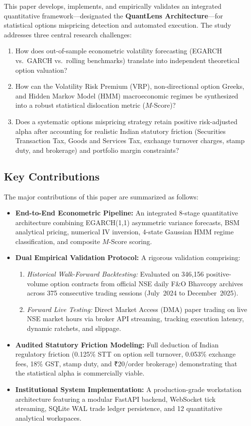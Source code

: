 \documentclass[journal]{IEEEtran}
\begin{document}
This paper develops, implements, and empirically validates an integrated quantitative framework---designated the \textbf{QuantLens Architecture}---for statistical options mispricing detection and automated execution. The study addresses three central research challenges:
\begin{enumerate}
    \item How does out-of-sample econometric volatility forecasting (EGARCH vs.\ GARCH vs.\ rolling benchmarks) translate into independent theoretical option valuation?
    \item How can the Volatility Risk Premium (VRP), non-directional option Greeks, and Hidden Markov Model (HMM) macroeconomic regimes be synthesized into a robust statistical dislocation metric ($M$-Score)?
    \item Does a systematic options mispricing strategy retain positive risk-adjusted alpha after accounting for realistic Indian statutory friction (Securities Transaction Tax, Goods and Services Tax, exchange turnover charges, stamp duty, and brokerage) and portfolio margin constraints?
\end{enumerate}

\subsection*{Key Contributions}
The major contributions of this paper are summarized as follows:
\begin{itemize}
    \item \textbf{End-to-End Econometric Pipeline:} An integrated 8-stage quantitative architecture combining EGARCH(1,1) asymmetric variance forecasts, BSM analytical pricing, numerical IV inversion, 4-state Gaussian HMM regime classification, and composite $M$-Score scoring.
    \item \textbf{Dual Empirical Validation Protocol:} A rigorous validation comprising:
    \begin{enumerate}
        \item \emph{Historical Walk-Forward Backtesting:} Evaluated on 346{,}156 positive-volume option contracts from official NSE daily F\&O Bhavcopy archives across 375 consecutive trading sessions (July~2024 to December~2025).
        \item \emph{Forward Live Testing:} Direct Market Access (DMA) paper trading on live NSE market hours via broker API streaming, tracking execution latency, dynamic ratchets, and slippage.
    \end{enumerate}
    \item \textbf{Audited Statutory Friction Modeling:} Full deduction of Indian regulatory friction (0.125\% STT on option sell turnover, 0.053\% exchange fees, 18\% GST, stamp duty, and ₹20/order brokerage) demonstrating that the statistical alpha is commercially viable.
    \item \textbf{Institutional System Implementation:} A production-grade workstation architecture featuring a modular FastAPI backend, WebSocket tick streaming, SQLite WAL trade ledger persistence, and 12 quantitative analytical workspaces.
\end{itemize}
\end{document}
